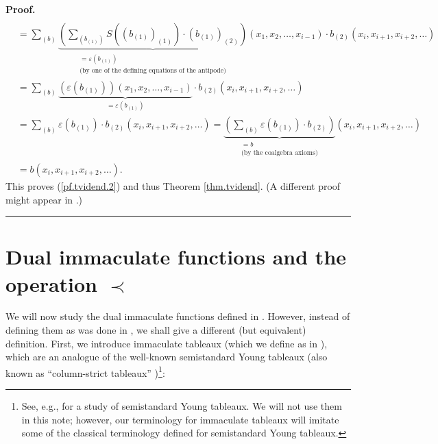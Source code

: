 \documentclass
[numbers=enddot,12pt,final,onecolumn,notitlepage,abstracton]{scrartcl}%
\theoremstyle{definition}
\newenvironment{proof}[1][Proof]{\noindent\textbf{#1.} }{\ \rule{0.5em}{0.5em}}
\newenvironment{verlong}{}{}
\newenvironment{noncompile}{}{}
\let\sumnonlimits\sum
\renewcommand{\sum}{\sumnonlimits\limits}
\begin{document}
\begin{verlong}
\begin{noncompile}
\begin{proof}
\begin{align*}
\\
&  =\sum_{\left(  b\right)  }\underbrace{\left(  \sum_{\left(  b_{\left(
1\right)  }\right)  }S\left(  \left(  b_{\left(  1\right)  }\right)  _{\left(
1\right)  }\right)  \cdot\left(  b_{\left(  1\right)  }\right)  _{\left(
2\right)  }\right)  }_{\substack{=\varepsilon\left(  b_{\left(  1\right)
}\right)  \\\text{(by one of the defining equations of the antipode)}}}\left(
x_{1},x_{2},\ldots,x_{i-1}\right)  \cdot b_{\left(  2\right)  }\left(
x_{i},x_{i+1},x_{i+2},\ldots\right) \\
&  =\sum_{\left(  b\right)  }\underbrace{\left(  \varepsilon\left(  b_{\left(
1\right)  }\right)  \right)  \left(  x_{1},x_{2},\ldots,x_{i-1}\right)
}_{=\varepsilon\left(  b_{\left(  1\right)  }\right)  }\cdot b_{\left(
2\right)  }\left(  x_{i},x_{i+1},x_{i+2},\ldots\right) \\
&  =\sum_{\left(  b\right)  }\varepsilon\left(  b_{\left(  1\right)  }\right)
\cdot b_{\left(  2\right)  }\left(  x_{i},x_{i+1},x_{i+2},\ldots\right)
=\underbrace{\left(  \sum_{\left(  b\right)  }\varepsilon\left(  b_{\left(
1\right)  }\right)  \cdot b_{\left(  2\right)  }\right)  }%
_{\substack{=b\\\text{(by the coalgebra axioms)}}}\left(  x_{i},x_{i+1}%
,x_{i+2},\ldots\right) \\
&  =b\left(  x_{i},x_{i+1},x_{i+2},\ldots\right)  .
\end{align*}
This proves (\ref{pf.tvidend.2}) and thus Theorem \ref{thm.tvidend}. (A
different proof might appear in \cite{Gri-gammapart}.)
\end{proof}
\end{noncompile}
\end{verlong}

\section{\label{sect.dualimmac}Dual immaculate functions and the operation
$\left.  \prec\right.  $}

We will now study the dual immaculate functions defined in \cite{BBSSZ}.
However, instead of defining them as was done in \cite[Section 3.7]{BBSSZ}, we
shall give a different (but equivalent) definition. First, we introduce
immaculate tableaux (which we define as in \cite[Definition 3.9]{BBSSZ}),
which are an analogue of the well-known semistandard Young tableaux (also
known as \textquotedblleft column-strict tableaux\textquotedblright%
)\footnote{See, e.g., \cite[Chapter 7]{Stanley-EC2} for a study of
semistandard Young tableaux. We will not use them in this note; however, our
terminology for immaculate tableaux will imitate some of the classical
terminology defined for semistandard Young tableaux.}:
\end{document}
